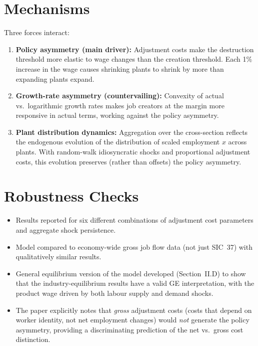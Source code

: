 \section{Mechanisms}

Three forces interact:
\begin{enumerate}
  \item \textbf{Policy asymmetry (main driver):} Adjustment costs make the
    destruction threshold more elastic to wage changes than the creation
    threshold. Each 1\% increase in the wage causes shrinking plants to shrink
    by more than expanding plants expand.
  \item \textbf{Growth-rate asymmetry (countervailing):} Convexity of actual
    vs.\ logarithmic growth rates makes job creators at the margin more
    responsive in actual terms, working against the policy asymmetry.
  \item \textbf{Plant distribution dynamics:} Aggregation over the cross-section
    reflects the endogenous evolution of the distribution of scaled employment
    $x$ across plants. With random-walk idiosyncratic shocks and proportional
    adjustment costs, this evolution preserves (rather than offsets) the policy
    asymmetry.
\end{enumerate}

\section{Robustness Checks}

\begin{itemize}
  \item Results reported for six different combinations of adjustment cost
    parameters and aggregate shock persistence.
  \item Model compared to economy-wide gross job flow data (not just SIC~37)
    with qualitatively similar results.
  \item General equilibrium version of the model developed (Section~II.D)
    to show that the industry-equilibrium results have a valid GE
    interpretation, with the product wage driven by both labour supply and
    demand shocks.
  \item The paper explicitly notes that \emph{gross} adjustment costs (costs
    that depend on worker identity, not net employment changes) would
    \emph{not} generate the policy asymmetry, providing a discriminating
    prediction of the net vs.\ gross cost distinction.
\end{itemize}

